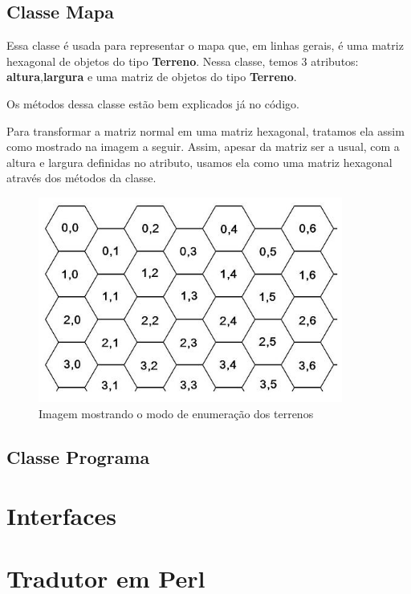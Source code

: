 \documentclass[11pt]{article}
\begin{document}
\subsection{Classe Mapa}

Essa classe é usada para representar o mapa que, em linhas gerais, é uma matriz hexagonal de objetos do tipo \textbf{\color{red}Terreno}. Nessa classe, temos 3 atributos: \textbf{\color{red}altura},\textbf{\color{red}largura} e uma matriz de objetos do tipo \textbf{\color{red}Terreno}.

Os métodos dessa classe estão bem explicados já no código.

Para transformar a matriz normal em uma matriz hexagonal, tratamos ela assim como mostrado na imagem a seguir. Assim, apesar da matriz ser a usual, com a altura e largura definidas no atributo, usamos ela como uma matriz hexagonal através dos métodos da classe.

\begin{figure}[h]

    \center

    \includegraphics[width=10cm]{hex_array.jpg}

    \label{hexmatrix}

    \caption{Imagem mostrando o modo de enumeração dos terrenos}

\end{figure}

\subsection{Classe Programa}

\section{Interfaces}

\section{Tradutor em Perl}
\end{document}
